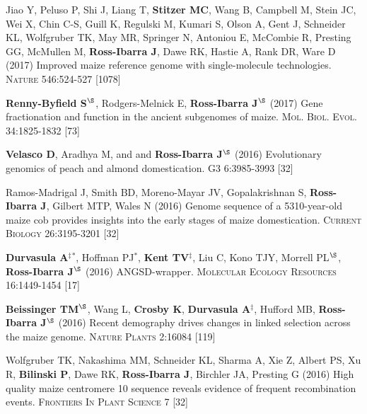 \documentclass[letterpaper,10pt]{article}
\begin{document}
\begin{etaremune}
\item  Jiao Y, Peluso P,  Shi J,  Liang T, {\bf Stitzer MC}, Wang B,  Campbell M, Stein JC,  Wei X,  Chin C-S,  Guill K,  Regulski M,  Kumari S,  Olson A,  Gent J, Schneider KL,  Wolfgruber TK, May MR, Springer N,  Antoniou E,  McCombie R, Presting GG,  McMullen M, {\bf Ross-Ibarra J}, Dawe RK,  Hastie A, Rank DR, Ware D (2017) Improved maize reference genome with single-molecule technologies. \textsc{Nature}  546:524-527
 [1078]\\

\item  {\bf Renny-Byfield S}$^\S$, Rodgers-Melnick E, {\bf Ross-Ibarra J}$^\S$ (2017) Gene fractionation and function in the ancient subgenomes of maize. \textsc{Mol. Biol. Evol.} 34:1825-1832
 [73]\\

\item {\bf Velasco D}, Aradhya M, and  and {\bf Ross-Ibarra J}$^\S$ (2016) Evolutionary genomics of peach and almond domestication. \textsc{G3} 6:3985-3993
 [32]\\

\item Ramos-Madrigal J, Smith BD, Moreno-Mayar JV, Gopalakrishnan S, {\bf Ross-Ibarra J}, Gilbert MTP, Wales N (2016) Genome sequence of a 5310-year-old maize cob provides insights into the early stages of maize domestication. \textsc{Current Biology} 26:3195-3201
 [32]\\

\item {\bf Durvasula A}$^\ddagger$$^*$,  Hoffman PJ$^*$, {\bf Kent TV}$^\ddagger$, Liu C, Kono TJY, Morrell PL$^\S$, {\bf Ross-Ibarra J}$^\S$ (2016) ANGSD-wrapper. \textsc{Molecular Ecology Resources} 16:1449-1454
 [17]\\

\item {\bf Beissinger TM}$^\S$, Wang L, {\bf Crosby K}, {\bf Durvasula A}$^\ddagger$, Hufford MB, {\bf Ross-Ibarra J}$^\S$ (2016)  Recent demography drives changes in linked selection across the maize genome. \textsc{Nature Plants} 2:16084
 [119]\\

\item Wolfgruber TK, Nakashima MM, Schneider KL, Sharma A, Xie Z, Albert PS, Xu R, {\bf Bilinski P},  Dawe RK, {\bf Ross-Ibarra J}, Birchler JA, Presting G (2016) High quality maize centromere 10 sequence reveals evidence of frequent recombination events. \textsc{Frontiers In Plant Science} 7
 [32]\\


\end{etaremune}
\end{document}
